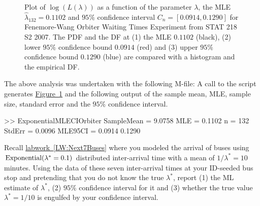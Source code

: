 \begin{figure}[htpb]
\caption{Plot of $\log(L(\lambda))$ as a function of the parameter $\lambda$, the MLE 
$\widehat{\lambda}_{132}=0.1102$ and $95\%$ confidence interval $C_n=[0.0914, 0.1290]$ for Fenemore-Wang Orbiter Waiting Times Experiment from STAT 218 S2 2007.  The PDF and the DF at (1) the MLE $0.1102$ (black), (2) lower $95\%$ confidence bound $0.0914$ (red) and (3) upper $95\%$ confidence bound $0.1290$ (blue) are compared with a histogram and the empirical DF.
\label{F:ExponentialMLECIOrbiter}}
\centering   {}
\end{figure}

\begin{labwork}\label{LW:ExponentialMLECIOrbiter}
The above analysis was undertaken with the following M-file:
A call to the script generates \hyperref[F:ExponentialMLECIOrbiter]{Figure~\ref*{F:ExponentialMLECIOrbiter}} and the following output of the sample mean, MLE, sample size, standard error and the $95\%$ confidence interval.  
\begin{VrbM}
>> ExponentialMLECIOrbiter
SampleMean =    9.0758
MLE =    0.1102
n =   132
StdErr =    0.0096
MLE95CI =    0.0914    0.1290
\end{VrbM}
\end{labwork}

\begin{labwork} \label{LW:IDSeededBusStopMLECI}
Recall \hyperref[LW:Next7Buses]{labwork~\ref*{LW:Next7Buses}} where you modeled the arrival of buses using $\mbox{{\rm Exponential}}(\lambda^*=0.1)$ distributed inter-arrival time with a mean of $1/\lambda^*=10$ minutes.  Using the data of these seven inter-arrival times at your ID-seeded bus stop and pretending that you do not know the true $\lambda^*$, report (1) the ML estimate of $\lambda^*$, (2) $95\%$ confidence interval for it and (3) whether the true value $\lambda^*=1/10$ is engulfed by your confidence interval.  
\end{labwork}

